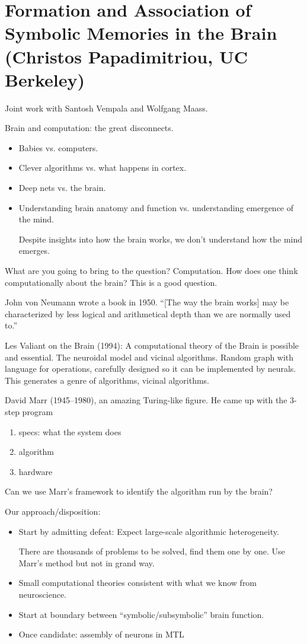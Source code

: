 \section{Formation and Association of Symbolic Memories in the Brain (Christos Papadimitriou, UC Berkeley)}


Joint work with Santosh Vempala and Wolfgang Maass.

Brain and computation: the great disconnects.
\begin{itemize}
\item
Babies vs. computers.
\item
Clever algorithms vs. what happens in cortex.
\item
Deep nets vs. the brain.
\item
Understanding brain anatomy and function vs. understanding emergence of the mind.

Despite insights into how the brain works, we don't understand how the mind emerges.
\end{itemize}

What are you going to bring to the question? Computation. How does one think computationally about the brain? This is a good question. 

John von Neumann wrote a book in 1950. ``[The way the brain works] may be characterized by less logical and arithmetical depth than we are normally used to.''


Les Valiant on the Brain (1994): A computational theory of the Brain is possible and essential. The neuroidal model and vicinal algorithms.
Random graph with language for operations, carefully designed so it can be implemented by neurals. This generates a genre of algorithms, vicinal algorithms. 

David Marr (1945--1980), an amazing Turing-like figure. %
He came up with the 3-step program
\begin{enumerate}
\item
specs: what the system does
\item
algorithm
\item
hardware
\end{enumerate}

Can we use Marr's framework to identify the algorithm run by the brain?

Our approach/disposition:
\begin{itemize}
\item
Start by admitting defeat: Expect large-scale algorithmic heterogeneity.

There are thousands of problems to be solved, find them one by one. Use Marr's method but not in grand way.
\item
Small computational theories consistent with what we know from neuroscience.
\item
Start at boundary between ``symbolic/subsymbolic'' brain function.
\item
Once candidate: assembly of neurons in MTL
\end{itemize}

